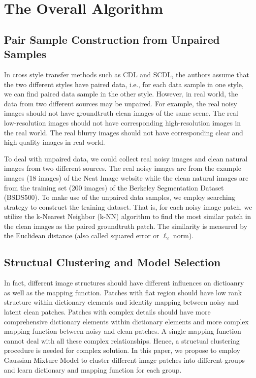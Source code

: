 \documentclass[10pt,twocolumn,letterpaper]{article}
\begin{document}
\section{The Overall Algorithm}

\subsection{Pair Sample Construction from Unpaired Samples}
In cross style transfer methods such as CDL and SCDL, the authors assume that the two different styles have paired data, i.e., for each data sample in one style, we can find paired data sample in the other style. However, in real world, the data from two different sources may be unpaired. For example, the real noisy images should not have groundtruth clean images of the same scene. The real low-resolution images should not have corresponding high-resolution images in the real world. The real blurry images should not have corresponding clear and high quality images in real world.

To deal with unpaired data, we could collect real noisy images and clean natural images from two different sources. The real noisy images are from the example images (18 images) of the Neat Image website while the clean natural images are from the training set (200 images) of the Berkeley Segmentation Dataset (BSDS500). To make use of the unpaired data samples, we employ searching strategy to construct the training dataset. That is, for each noisy image patch, we utilize the k-Nearest Neighbor (k-NN) algorithm to find the most similar patch in the clean images as the paired groundtruth patch. The similarity is measured by the Euclidean distance (also called squared error or $\ell_{2}$ norm).

\subsection{Structual Clustering and Model Selection}
In fact, different image structures should have different influences on dictioanry as well as the mapping function. Patches with flat region should have low rank structure within dictionary elements and identity mapping between noisy and latent clean patches. Patches with complex details should have more comprehensive dictionary elements within dictionary elements and more complex mapping function between noisy and clean patches. A single mapping function cannot deal with all these complex relationships. Hence, a structual clustering procedure is needed for complex solution. In this paper, we propose to employ Gaussian Mixture Model to cluster different image patches into different groups and learn dictionary and mapping function for each group.
\end{document}
